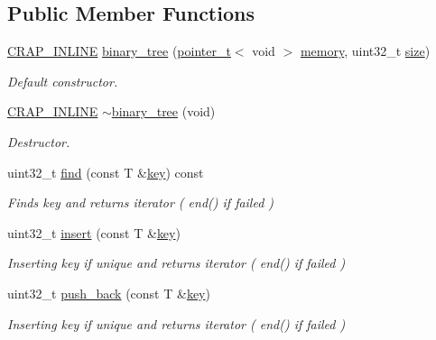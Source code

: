 \subsection*{Public Member Functions}
\begin{DoxyCompactItemize}
\item 
\hyperlink{config__x86_8h_a5a40526b8d842e7ff731509998bb0f1c}{C\+R\+A\+P\+\_\+\+I\+N\+L\+I\+N\+E} \hyperlink{classcrap_1_1binary__tree_a235df9c4c0ee03175d08b68b776498af}{binary\+\_\+tree} (\hyperlink{structcrap_1_1pointer__t}{pointer\+\_\+t}$<$ void $>$ \hyperlink{classcrap_1_1binary__tree_a4e2a6b711e97bc978ab707bd48b44635}{memory}, uint32\+\_\+t \hyperlink{classcrap_1_1binary__tree_a9e738d5a81082e3b5f653fd8e0caf705}{size})
\begin{DoxyCompactList}\small\item\em Default constructor. \end{DoxyCompactList}\item 
\hyperlink{config__x86_8h_a5a40526b8d842e7ff731509998bb0f1c}{C\+R\+A\+P\+\_\+\+I\+N\+L\+I\+N\+E} \hyperlink{classcrap_1_1binary__tree_a6a8874aa9f6fdc7831e130d4b466d568}{$\sim$binary\+\_\+tree} (void)
\begin{DoxyCompactList}\small\item\em Destructor. \end{DoxyCompactList}\item 
uint32\+\_\+t \hyperlink{classcrap_1_1binary__tree_af747bfe4e0022a01ae09761944de36b4}{find} (const T \&\hyperlink{classcrap_1_1binary__tree_ac119732cd07f83ed5161ebc86d0e31c6}{key}) const 
\begin{DoxyCompactList}\small\item\em Finds key and returns iterator ( end() if failed ) \end{DoxyCompactList}\item 
uint32\+\_\+t \hyperlink{classcrap_1_1binary__tree_a7456cc6905bc3866dece32e53f59468f}{insert} (const T \&\hyperlink{classcrap_1_1binary__tree_ac119732cd07f83ed5161ebc86d0e31c6}{key})
\begin{DoxyCompactList}\small\item\em Inserting key if unique and returns iterator ( end() if failed ) \end{DoxyCompactList}\item 
uint32\+\_\+t \hyperlink{classcrap_1_1binary__tree_a82e0c5b629a5c993fa61657150874cdb}{push\+\_\+back} (const T \&\hyperlink{classcrap_1_1binary__tree_ac119732cd07f83ed5161ebc86d0e31c6}{key})
\begin{DoxyCompactList}\small\item\em Inserting key if unique and returns iterator ( end() if failed ) \end{DoxyCompactList}\item 

\end{DoxyCompactItemize}

